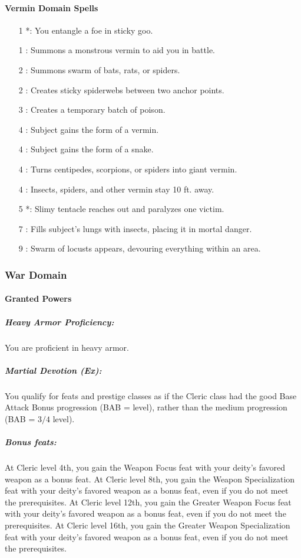 \paragraph{Vermin Domain Spells}
\begin{itemize}
\item[1] *: You entangle a foe in sticky goo.
\item[1] : Summons a monstrous vermin to aid you in battle.
\item[2] : Summons swarm of bats, rats, or spiders.
\item[2] : Creates sticky spiderwebs between two anchor points.
\item[3] : Creates a temporary batch of poison.
\item[4] : Subject gains the form of a vermin.
\item[4] : Subject gains the form of a snake.
\item[4] : Turns centipedes, scorpions, or spiders into giant vermin.
\item[4] : Insects, spiders, and other vermin stay 10 ft. away.
\item[5] *: Slimy tentacle reaches out and paralyzes one victim.
\item[7] : Fills subject's lungs with insects, placing it in mortal danger.
\item[9] : Swarm of locusts appears, devouring everything within an area.
\end{itemize}
\subsubsection{War Domain}
\paragraph{Granted Powers}
\subparagraph{Heavy Armor Proficiency:}
You are proficient in heavy armor. 
\subparagraph{Martial Devotion (Ex):}
You qualify for feats and prestige classes as if the Cleric class
had the good Base Attack Bonus progression (BAB = level), rather than the medium progression (BAB = $3/4$ level).

\subparagraph{Bonus feats:}
At Cleric level 4th, you gain the Weapon Focus feat with your deity's favored weapon as a bonus feat.
At Cleric level 8th, you gain the Weapon Specialization feat with your deity's favored weapon as a bonus feat, even if you do not meet the prerequisites.
At Cleric level 12th, you gain the Greater Weapon Focus feat with your deity's favored weapon as a bonus feat, even if you do not meet the prerequisites.
At Cleric level 16th, you gain the Greater Weapon Specialization feat with your deity's favored weapon as a bonus feat, even if you do not meet the prerequisites.

